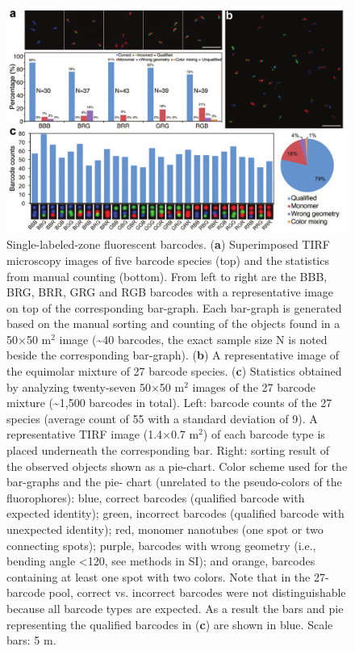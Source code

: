 \begin{figure} %
\includegraphics[width=\textwidth]{figures/dna2}
\caption[Single-labeled-zone fluorescent barcodes.]{Single-labeled-zone fluorescent barcodes. (\textbf{a}) Superimposed TIRF microscopy 
images of five barcode species (top) and the statistics from manual counting (bottom). 
From left to right are the BBB, BRG, BRR, GRG and RGB barcodes with a 
representative image on top of the corresponding bar-graph. Each bar-graph is generated 
based on the manual sorting and counting of the objects found in a 50×50 \textmu m$^2$ image 
(\textasciitilde40 barcodes, the exact sample size N is noted beside the corresponding bar-graph). (\textbf{b}) 
A representative image of the equimolar mixture of 27 barcode species. (\textbf{c}) Statistics 
obtained by analyzing twenty-seven 50×50 \textmu m$^2$ images of the 27 barcode mixture 
(\textasciitilde1,500 barcodes in total). Left: barcode counts of the 27 species (average count of 55 
with a standard deviation of 9). A representative TIRF image (1.4×0.7 \textmu m$^2$) of each 
barcode type is placed underneath the corresponding bar. Right: sorting result of the 
observed objects shown as a pie-chart. Color scheme used for the bar-graphs and the pie- 
chart (unrelated to the pseudo-colors of the fluorophores): blue, correct barcodes 
(qualified barcode with expected identity); green, incorrect barcodes (qualified barcode 
with unexpected identity); red, monomer nanotubes (one spot or two connecting spots); 
purple, barcodes with wrong geometry (i.e., bending angle <120\textdegree, see methods in SI); 
and orange, barcodes containing at least one spot with two colors. Note that in the 27- 
barcode pool, correct vs. incorrect barcodes were not distinguishable because all barcode 
types are expected. As a result the bars and pie representing the qualified barcodes in (\textbf{c}) 
are shown in blue. Scale bars: 5 \textmu m.\label{fig:dna2}}
\end{figure}
	

